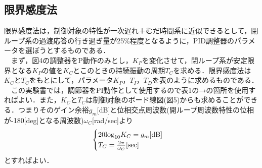 \documentclass[12pt]{jsarticle}
\begin{document}
\subsection{限界感度法}
限界感度法は，制御対象の特性が一次遅れ＋むだ時間系に近似できるとして，閉ループ系の過渡応答の行き過ぎ量が25\%程度となるように，PID調整器のパラメータを選ぼうとするものである．\\
　まず，図4の調整器をP動作のみとし，$K_P$を変化させて，閉ループ系が安定限界となる$K_P$の値を$K_C$とこのときの持続振動の周期$T_C$を求める．限界感度法は$K_C$と$T_C$をもとにして，パラメータ$K_P$，$T_I$，$T_D$を表のように求めるものである．\\
　この実験書では，調節器をPI動作として使用するので表1の→の箇所を使用すればよい．また，$K_C$と$T_C$は制御対象のボード線図(図5)からも求めることができる．つまりそのゲイン余裕$g_m$[dB]と位相交点周波数(開ループ周波数特性の位相が-180[deg]となる周波数)$\omega_C$[rad/sec]より
\begin{eqnarray}
  \begin{cases}
    20{\rm log}_{10}K_C = g_m  [\rm dB] & \\
    T_C = \frac{2\pi}{\omega_C} [\rm sec] &
  \end{cases}
\end{eqnarray}
とすればよい．
\begin{table}[tb]
  \begin{center}
    \label{Ziegler-Nichols}
    \caption{Ziegler-Nicholsの限界感度法}
  \end{center}
\end{table}
\end{document}
